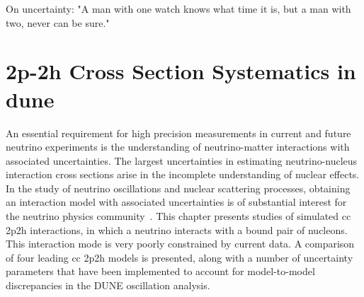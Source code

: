 \begin{savequote}[8cm]
\textlatin{On uncertainty: "A man with one watch knows what time it is, but a man with two, never can be sure."
  }
\end{savequote}

\chapter{2p-2h Cross Section Systematics in \texorpdfstring{\acrshort{dune}}{TEXT}}
%
\minitoc
%
An essential requirement for high precision measurements in current and future neutrino experiments is the understanding of neutrino-matter interactions with associated uncertainties. The largest uncertainties in estimating neutrino-nucleus interaction cross sections arise in the incomplete understanding of nuclear effects. %
In the study of neutrino oscillations and nuclear scattering processes, obtaining an interaction model with associated uncertainties is of substantial interest for the neutrino physics community~\cite{Dolan:2018zye,Formaggio:2013kya,PhysRevC.94.015503,Furmanski:2016wqo,Katori:2016yel}. %
This chapter presents studies of simulated \acrshort{cc} \acrshort{2p2h} interactions, in which a neutrino interacts with a bound pair of nucleons. This interaction mode is very poorly constrained by current data. A comparison of four leading \acrshort{cc} \acrshort{2p2h} models is presented, along with a number of uncertainty parameters that have been implemented to account for model-to-model discrepancies in the DUNE oscillation analysis.

